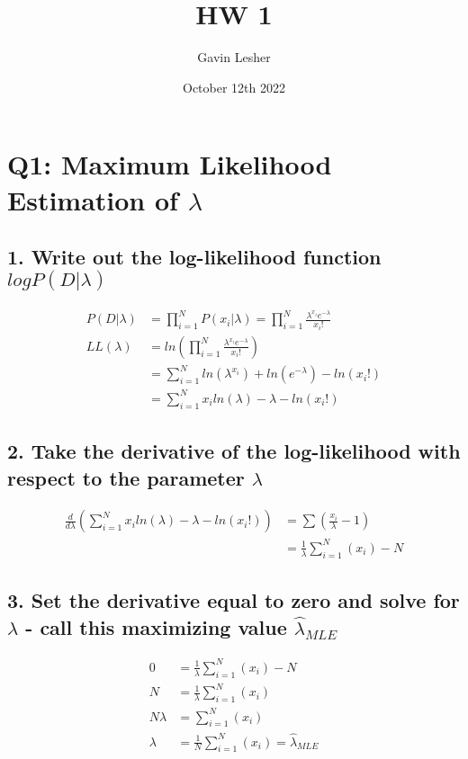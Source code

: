 \documentclass{article}
\title{HW 1}
\author{Gavin Lesher}
\date{October 12th 2022}
\begin{document}
    \maketitle
    \section*{Q1: Maximum Likelihood Estimation of $\lambda$}
        \subsection*{1. Write out the log-likelihood function $logP(D|\lambda)$}

            \begin{align*}
                P(D|\lambda) &= \prod^{N}_{i=1} P(x_i | \lambda) = \prod_{i=1}^{N} \frac{\lambda^{x_i}e^{-\lambda}}{x_i!}\\
                LL(\lambda)&= ln(\prod_{i=1}^{N} \frac{\lambda^{x_i}e^{-\lambda}}{x_i!})\\
                &= \sum_{i=1}^{N} ln(\lambda^{x_i}) + ln(e^{-\lambda}) - ln(x_i!)\\
                &= \sum_{i=1}^{N} x_iln(\lambda) - \lambda - ln(x_i!)
            \end{align*}

        \subsection*{2. Take the derivative of the log-likelihood with respect to the parameter $\lambda$}
            \begin{align*}
                \frac{d}{d\lambda}\left(\sum_{i=1}^{N} x_iln(\lambda) - \lambda - ln(x_i!)\right) &= \sum\left(\frac{x_i}{\lambda} -1\right) \\
                &= \frac{1}{\lambda}\sum_{i=1}^N (x_i) -N
            \end{align*}

        \subsection*{3. Set the derivative equal to zero and solve for $\lambda$ - call this maximizing value $\hat{\lambda}_{MLE}$}
    
            \begin{align*}
                0 &= \frac{1}{\lambda}\sum_{i=1}^N (x_i) -N\\
                N &= \frac{1}{\lambda}\sum_{i=1}^N (x_i)\\
                N\lambda &= \sum_{i=1}^N (x_i)\\
                \lambda &= \frac{1}{N}\sum_{i=1}^N (x_i) = \hat{\lambda}_{MLE}
            \end{align*}
\end{document}
